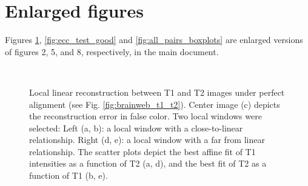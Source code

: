 \documentclass[journal]{IEEEtran}
\newcommand{\figcloser}{\vspace{-0.4cm}}
\begin{document}
\section{Enlarged figures}
Figures \ref{fig:llr_test}, \ref{fig:ecc_test_good} and \ref{fig:all_pairs_boxplots} are enlarged versions of figures 2, 5, and 8, respectively, in the main document. 


\begin{figure}[t!]
\centering
    \\
    \caption{{\small Local linear reconstruction between T1 and T2 images under perfect alignment (see Fig. \ref{fig:brainweb_t1_t2}). Center image (c) depicts the reconstruction error in false color. Two local windows were selected: Left (a, b): a local window with a close-to-linear relationship. Right (d, e): a local window with a far from linear relationship. The scatter plots depict the best affine fit of T1 intensities as a function of T2 (a, d), and the best fit of T2 as a function of T1 (b, e).}}
\label{fig:llr_test}\figcloser
\end{figure}
\end{document}

